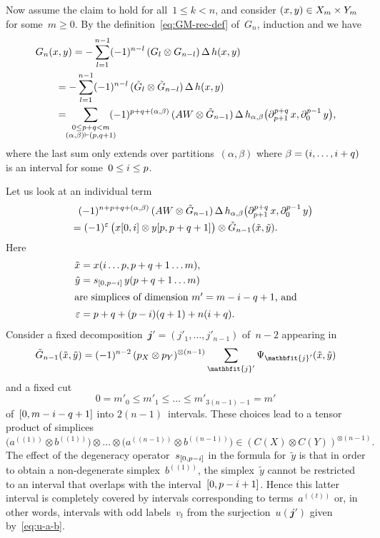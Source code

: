 \documentclass[letterpaper]{amsart}
\numberwithin{equation}{section}
\theoremstyle{plain}
\theoremstyle{definition}
\theoremstyle{remark}
\let\epsilon\varepsilon
\def\jj{\mathbfit{j}}
\def\sweehgc#1#2{#1^{(\!(#2)\!)}}
\def\AW{AW}
\def\restr#1#2#3{#1[#2,#3]}
\begin{document}
Now assume the claim to hold for all~$1\le k<n$, and consider $(x,y)\in X_{m}\times Y_{m}$ for some~$m\ge0$.
By the definition~\eqref{eq:GM-rec-def} of~$G_{n}$, induction and  we have
\begin{align}
  \MoveEqLeft{G_{n}(x,y) = -\sum_{l=1}^{n-1} (-1)^{n-l}\,(G_{l}\otimes G_{n-l})\,\Delta\,h(x,y)} \\
  \notag &= -\sum_{l=1}^{n-1} (-1)^{n-l}\,(\GG_{l}\otimes\GG_{n-l})\,\Delta\,h(x,y) \\
  \notag &= \!\! \sum_{\substack{0\le p+q < \n\\(\alpha,\beta)\vdash(p,q+1)}} \!\!\!\! (-1)^{p+q+(\alpha,\beta)}\,
    (\AW\otimes\GG_{n-1})\,\Delta\,h_{\alpha,\beta}\bigl(\partial_{p+1}^{p+q}\,x,\partial_{0}^{p-1}\,y\bigr),
\end{align}
where the last sum only extends over partitions~$(\alpha,\beta)$ where $\beta=(i,\dots,i+q)$ is an interval for some~$0\le i\le p$.

Let us look at an individual term
\begin{multline}
  \label{eq:g-G}
  \qquad
  (-1)^{n+p+q+(\alpha,\beta)}\,
  (\AW\otimes\GG_{n-1})\,\Delta\, h_{\alpha,\beta}\bigl(\partial_{p+1}^{p+q}\,x,\partial_{0}^{p-1}\,y\bigr) \\
  = (-1)^{\epsilon}\,\bigl(\restr{x}{0}{\si} \otimes \restr{y}{p}{p+q+1}\bigr) \otimes \GG_{n-1}(\tilde{x},\tilde{y}).
  \qquad
\end{multline}
Here
\begin{align}
  \tilde{x} &= x(\si\dots p,p+q+1\dots \n), \\
  \tilde{y} &= s_{[0,p-\si]}\,y(p+q+1\dots \n) \\
  \shortintertext{are simplices of dimension~$\n'=\n-\si-q+1$, and}
  \label{eq:delta-total}
  \epsilon &= p+q+(p-\si)(q+1) + n(\si+q).
\end{align}
Consider a fixed decomposition~$\jj'=(j'_{1},\dots,j'_{n-1})$ of~$n-2$ appearing in
\begin{equation}
  \label{eq:GG-n1}
  \GG_{n-1}(\tilde{x},\tilde{y}) = (-1)^{n-2}\,(p_{X}\otimes p_{Y})^{\otimes(n-1)}\sum_{\jj'}\Psi_{\jj'}(\tilde{x},\tilde{y})
\end{equation}
and a fixed cut
\def\nn{m}
\begin{equation}
  0=\nn'_{0}\le \nn'_{1}\le \dots\le \nn'_{3(n-1)-1} = m'
\end{equation}
of~$[0,m-i-q+1]$ into $2(n-1)$~intervals. These choices lead to a tensor product of simplices
\begin{equation}
  \bigl(\sweehgc{a}{1} \otimes \sweehgc{b}{1}\bigr) \otimes \dots \otimes \bigl(\sweehgc{a}{n-1} \otimes \sweehgc{b}{n-1}\bigr) \in (C(X)\otimes C(Y))^{\otimes(n-1)}.
\end{equation}
The effect of the degeneracy operator~$s_{[0,p-i]}$ in the formula for~$\tilde{y}$ is
that in order to obtain a non-degenerate simplex~$\sweehgc{b}{1}$, the simplex~$\tilde{y}$ cannot be restricted to an interval
that overlaps with the interval~$[0,p-i+1]$. Hence this latter interval is completely covered
by intervals corresponding to terms~$\sweehgc{a}{t}$ or, in other words, intervals with odd labels~$v_{t}$
from the surjection~$u(\jj')$ given by~\eqref{eq:u-a-b}.
\end{document}
